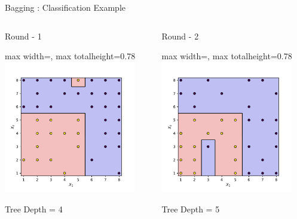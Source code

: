 \documentclass[9pt]{beamer}
\newcommand{\fitpic}[1]{\begin{adjustbox}{max width=\linewidth, max totalheight=0.78\textheight}#1\end{adjustbox}}
\begin{document}
\begin{frame}{Bagging : Classification Example}
  \vspace{0.3cm}
  \begin{columns}
    \pause  \begin{column}{0.3\textwidth}
      \centering
      Round - 1\\

      \fitpic{\includegraphics[width = 0.9\textwidth]{../assets/ensemble/figures/decision-boundary-0}}
      Tree Depth = 4

    \end{column}
    \pause  \begin{column}{0.3\textwidth}
      \centering
      Round - 2\\

      \fitpic{\includegraphics[width = 0.9\textwidth]{../assets/ensemble/figures/decision-boundary-1}}
      Tree Depth = 5


\end{column}
\end{columns}
\end{frame}
\end{document}
